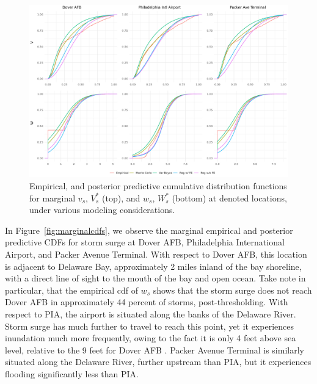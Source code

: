 \begin{figure}[ht]
    \centering
    \includegraphics[width=0.95\linewidth]{./plots/delaware_marginal_cdfs.png}
    \caption{Empirical, and posterior predictive cumulative distribution functions for
        marginal $v_s$, $V_s^*$ (top), and $w_s$, $W_s^*$ (bottom) at denoted locations, under
        various modeling considerations.\label{plot:marginalcdfs}}
\end{figure}

In Figure~\ref{fig:marginalcdfs}, we observe the marginal empirical and posterior predictive
    CDFs for storm surge at Dover AFB, Philadelphia International Airport, and Packer Avenue Terminal.
    With respect to Dover AFB, this location is adjacent to Delaware Bay, approximately 2 miles inland
    of the bay shoreline, with a direct line of sight to the mouth of the bay and open ocean.  Take
    note in particular, that the empirical cdf of $w_s$ shows that the storm surge does not reach
    Dover AFB in approximately \num{44} percent of storms, post-thresholding.  With respect to PIA,
    the airport is situated along the banks of the Delaware River.  Storm surge has much further to
    travel to reach this point, yet it experiences inundation much more frequently, owing to the fact
    it is only 4 feet above sea level, relative to the 9 feet for Dover AFB \makenote{[Confirm]}.  
    Packer Avenue Terminal is similarly situated along the Delaware River, further upstream than PIA,
    but it experiences flooding significantly less than PIA.

% 

